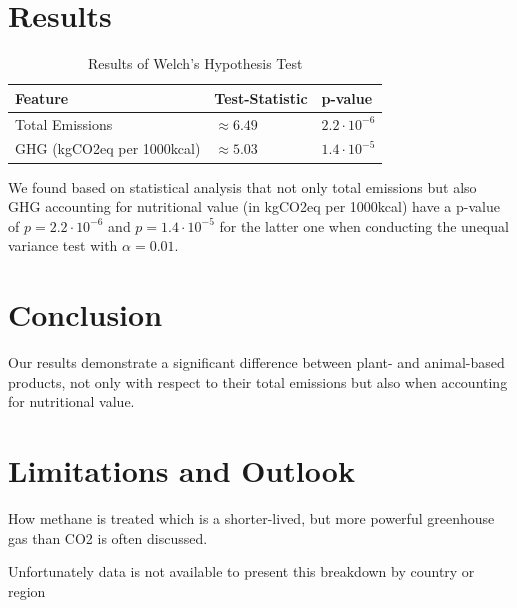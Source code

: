 \documentclass{article}
\begin{document}
\section{Results}
\begin{table} \label{tbl:results}
  \caption{Results of  Welch's Hypothesis Test}
  \label{sample-table}
  \centering
  \begin{tabular}{lll}
    \toprule
    Feature     & Test-Statistic   & p-value  \\
    \midrule
    Total Emissions &$\approx 6.49$  & $ 2.2\cdot10^{-6}  $  \\
    GHG (kgCO2eq per 1000kcal)    & $\approx 5.03 $  & $ 1.4\cdot10^{-5}$    \\
    \bottomrule
  \end{tabular}
\end{table}

We found based on statistical analysis that not only total emissions but also GHG accounting for nutritional value (in kgCO2eq per 1000kcal) have a p-value of  $p= 2.2\cdot10^{-6} $  and $p= 1.4\cdot10^{-5}$   for the latter one when conducting the unequal variance test with $\alpha = 0.01$.

\section{Conclusion}
\label{conclusion}
Our results demonstrate a significant difference between plant- and animal-based products, not only with respect to their total emissions but also when accounting for nutritional value. 

\section{Limitations and Outlook}
\label{limitations}
How methane is treated which is a shorter-lived, but more powerful greenhouse gas than CO2  is often discussed.

Unfortunately data is not available to present this breakdown by country or region
\end{document}
